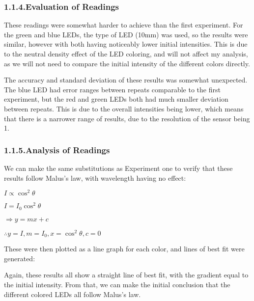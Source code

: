 \documentclass{article}
\begin{document}
\subsubsection{1.1.4.\hspace*{0.5em}Evaluation of Readings}\label{sec-evaluation-of-readings}%

\noindent{}These readings were somewhat harder to achieve than the first experiment. For the green and blue LEDs, the type of LED (10mm) was used, so the results were similar, however with both having noticeably lower initial intensities. This is due to the neutral density effect of the LED coloring, and will not affect my analysis, as we will not need to compare the initial intensity of the different colors directly.%

The accuracy and standard deviation of these results was somewhat unexpected. The blue LED had error ranges between repeats comparable to the first experiment, but the red and green LEDs both had much smaller deviation between repeats. This is due to the overall intensities being lower, which means that there is a narrower range of results, due to the resolution of the sensor being 1.%

\subsubsection{1.1.5.\hspace*{0.5em}Analysis of Readings}\label{sec-analysis-of-readings}%

\noindent{}We can make the same substitutions as Experiment one to verify that these results follow Malus's law, with wavelength having no effect:%

$I\propto\cos^2\theta$%

$I=I_0\cos^2\theta$%

$\Rightarrow y=mx+c$%

$\therefore y=I, m=I_0, x=\cos^2\theta, c=0$%

These were then plotted as a line graph for each color, and lines of best fit were generated:%

Again, these results all show a straight line of best fit, with the gradient equal to the initial intensity. From that, we can make the initial conclusion that the different colored LEDs all follow Malus's law.%
\end{document}
